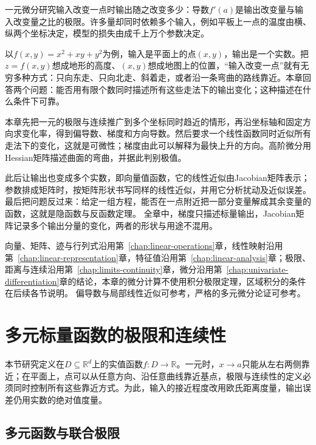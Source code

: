\par{}

\label{sec:analysis-multivariable-differentiation}
\label{sec:multivariable-differentiation}

一元微分研究输入改变一点时输出随之改变多少：导数$f'(a)$是输出改变量与输入改变量之比的极限。许多量却同时依赖多个输入，例如平板上一点的温度由横、纵两个坐标决定，模型的损失由成千上万个参数决定。

以$f(x,y)=x^2+xy+y^2$为例，输入是平面上的点$(x,y)$，输出是一个实数。把$z=f(x,y)$想成地形的高度、$(x,y)$想成地图上的位置，“输入改变一点”就有无穷多种方式：只向东走、只向北走、斜着走，或者沿一条弯曲的路线靠近。本章回答两个问题：能否用有限个数同时描述所有这些走法下的输出变化；这种描述在什么条件下可靠。

本章先把一元的极限与连续推广到多个坐标同时趋近的情形，再沿坐标轴和固定方向求变化率，得到偏导数、梯度和方向导数。然后要求一个线性函数同时近似所有走法下的变化，这就是可微性；梯度由此可以解释为最快上升的方向。高阶微分用Hessian矩阵描述曲面的弯曲，并据此判别极值。

此后让输出也变成多个实数，即向量值函数，它的线性近似由Jacobian矩阵表示；参数排成矩阵时，按矩阵形状书写同样的线性近似，并用它分析扰动及近似误差。最后把问题反过来：给定一组方程，能否在一点附近把一部分变量解成其余变量的函数，这就是隐函数与反函数定理。
全章中，梯度只描述标量输出，Jacobian矩阵记录多个输出分量的变化，两者的形状与用途不混用。

向量、矩阵、迹与行列式沿用第~\ref{chap:linear-operations}章，线性映射沿用第~\ref{chap:linear-representation}章，特征值沿用第~\ref{chap:linear-analysis}章；极限、距离与连续沿用第~\ref{chap:limits-continuity}章，微分沿用第~\ref{chap:univariate-differentiation}章的结论，本章的微分计算不使用积分极限定理，区域积分的条件在后续各节说明。
偏导数与局部线性近似可参考，严格的多元微分论证可参考。

\section{多元标量函数的极限和连续性}
\label{sec:multivariable-limits-continuity}

本节研究定义在$D\subseteq\mathbb R^d$上的实值函数$f:D\to\mathbb R$。一元时，$x\to a$只能从左右两侧靠近；在平面上，点可以从任意方向、沿任意曲线靠近基点，极限与连续性的定义必须同时控制所有这些靠近方式。为此，输入的接近程度改用欧氏距离度量，输出误差仍用实数的绝对值度量。

\subsection{多元函数与联合极限}

